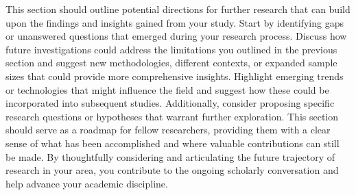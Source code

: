 This section should outline potential directions for further research that can build upon the findings and insights gained from your study. Start by identifying gaps or unanswered questions that emerged during your research process. Discuss how future investigations could address the limitations you outlined in the previous section and suggest new methodologies, different contexts, or expanded sample sizes that could provide more comprehensive insights. Highlight emerging trends or technologies that might influence the field and suggest how these could be incorporated into subsequent studies. Additionally, consider proposing specific research questions or hypotheses that warrant further exploration. This section should serve as a roadmap for fellow researchers, providing them with a clear sense of what has been accomplished and where valuable contributions can still be made. By thoughtfully considering and articulating the future trajectory of research in your area, you contribute to the ongoing scholarly conversation and help advance your academic discipline.